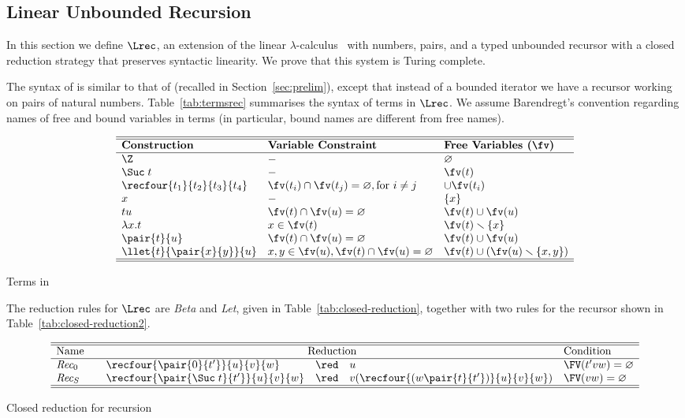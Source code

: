 \documentclass{article}
\begin{document}
\subsection{Linear Unbounded Recursion}
\label{sec:LLCIrec}
In this section we define $\Lrec$, an
extension of the linear $\lambda$-calculus~\cite{AbramskyS:comill}
with numbers, pairs, and a typed unbounded recursor with a closed
reduction strategy that preserves syntactic linearity. We prove that 
this system is Turing complete.


The syntax of \LLCIrec is similar to that of \LLCI (recalled in Section~\ref{sec:prelim}), except that
instead of a bounded iterator we have a recursor working on pairs of
natural numbers.  Table~\ref{tab:termsrec} summarises the syntax of
terms in $\Lrec$.  We assume Barendregt's convention regarding names
of free and bound variables in terms (in particular, bound names are different from free names).

\begin{table*}
\[
\begin{array}{l@{\quad}l@{\quad}ll} \hline\hline
\textbf{Construction} & \textbf{Variable Constraint} & \textbf{Free
Variables ($\fv$)} \\\hline
\Z &- & \varnothing \\ \Suc\;t & - & \fv(t)\\\recfour{t_1}{t_2}{t_3}{t_4} & \fv(t_i)\cap \fv(t_j)= \varnothing, \text{for } i\neq j& \cup \fv(t_i)\\
x &- & \{x\} \\ tu & \fv(t) \cap \fv(u) = \varnothing & \fv(t) \cup \fv(u) \\ \lambda x.t & x \in \fv(t) & \fv(t) \smallsetminus \{x\} \\ \pair{t}{u} & \fv(t) \cap \fv(u) = \varnothing & \fv(t) \cup \fv(u)\\ \llet{t}{\pair{x}{y}}{u} &  x,y \in \fv(u),
\fv(t) \cap \fv(u) = \varnothing 
 & \fv(t) \cup (\fv(u) \smallsetminus \{x,y\}) \\
\hline\hline
\end{array}
\]
\caption{Terms in \LLCIrec}\label{LrecTerms}\label{tab:termsrec}
\end{table*}

The reduction rules for $\Lrec$ are \emph{Beta} and \emph{Let}, 
given in Table~\ref{tab:closed-reduction}, together with
two rules for the recursor shown in Table~\ref{tab:closed-reduction2}.

\begin{table*}
\[
\begin{array}{llcl@{\quad}l}\hline\hline
\mbox{Name}\quad&\multicolumn{3}{c}{\mbox{Reduction}}& \mbox{Condition} \\ \hline
\emph{Rec}_0&\recfour{\pair{0}{t'}}{u}{v}{w} & \red & u &\FV(t'vw) = \varnothing\\
\emph{Rec}_S&\recfour{\pair{\Suc\;t}{t'}}{u}{v}{w} & \red & v (\recfour{(w\pair{t}{t'})}{u}{v}{w}) & \FV(vw) = \varnothing \\\hline\hline
\end{array}
\]
\caption{Closed reduction for recursion}\label{tab:closed-reduction2}
\end{table*}
\end{document}
